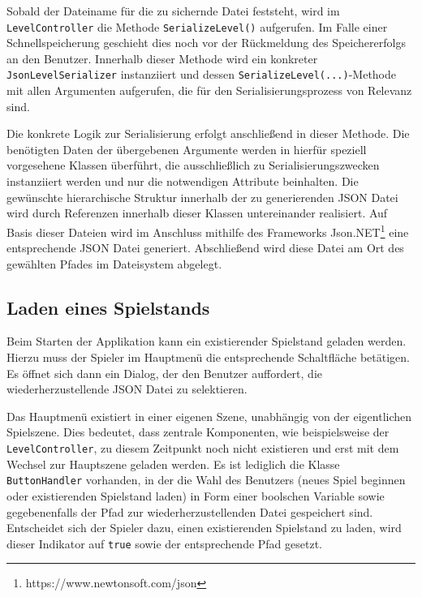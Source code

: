 Sobald der Dateiname für die zu sichernde Datei feststeht, wird im \texttt{LevelController} die Methode \texttt{SerializeLevel()} aufgerufen. Im Falle einer Schnellspeicherung geschieht dies noch vor der Rückmeldung des Speichererfolgs an den Benutzer. Innerhalb dieser Methode wird ein konkreter \texttt{JsonLevelSerializer} instanziiert und dessen \texttt{SerializeLevel(...)}-Methode mit allen Argumenten aufgerufen, die für den Serialisierungsprozess von Relevanz sind. 

Die konkrete Logik zur Serialisierung erfolgt anschließend in dieser Methode. Die benötigten Daten der übergebenen Argumente werden in hierfür speziell vorgesehene Klassen überführt, die ausschließlich zu Serialisierungszwecken instanziiert werden und nur die notwendigen Attribute beinhalten. Die gewünschte hierarchische Struktur innerhalb der zu generierenden JSON Datei wird durch Referenzen innerhalb dieser Klassen untereinander realisiert. Auf Basis dieser Dateien wird im Anschluss mithilfe des Frameworks Json.NET\footnote{https://www.newtonsoft.com/json} eine entsprechende JSON Datei generiert. Abschließend wird diese Datei am Ort des gewählten Pfades im Dateisystem abgelegt. 


\subsection{Laden eines Spielstands}

Beim Starten der Applikation kann ein existierender Spielstand geladen werden. Hierzu muss der Spieler im Hauptmenü die entsprechende Schaltfläche betätigen. Es öffnet sich dann ein Dialog, der den Benutzer auffordert, die wiederherzustellende JSON Datei zu selektieren.

Das Hauptmenü existiert in einer eigenen Szene, unabhängig von der eigentlichen Spielszene. Dies bedeutet, dass zentrale Komponenten, wie beispielsweise der \texttt{LevelController}, zu diesem Zeitpunkt noch nicht existieren und erst mit dem Wechsel zur Hauptszene geladen werden. Es ist lediglich die Klasse \texttt{ButtonHandler} vorhanden, in der die Wahl des Benutzers (neues Spiel beginnen oder existierenden Spielstand laden) in Form einer boolschen Variable sowie gegebenenfalls der Pfad zur wiederherzustellenden Datei gespeichert sind. Entscheidet sich der Spieler dazu, einen existierenden Spielstand zu laden, wird dieser Indikator auf \texttt{true} sowie der entsprechende Pfad gesetzt.

